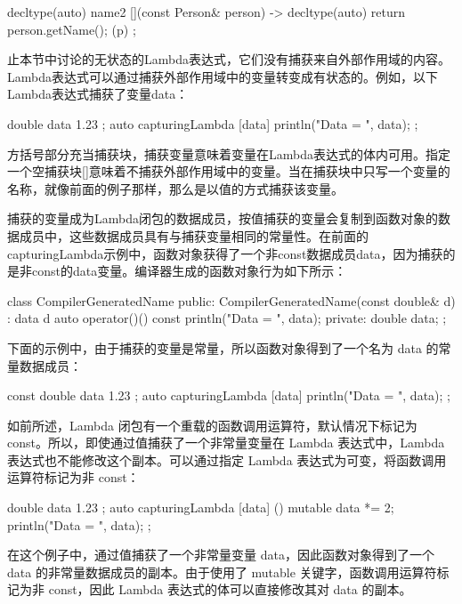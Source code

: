\begin{cpp}
decltype(auto) name2 { [](const Person& person) -> decltype(auto) {
        return person.getName(); }(p) };
\end{cpp}

止本节中讨论的无状态的Lambda表达式，它们没有捕获来自外部作用域的内容。Lambda表达式可以通过捕获外部作用域中的变量转变成有状态的。例如，以下Lambda表达式捕获了变量data：

\begin{cpp}
double data { 1.23 };
auto capturingLambda { [data]{ println("Data = {}", data); } };
\end{cpp}

方括号部分充当捕获块，捕获变量意味着变量在Lambda表达式的体内可用。指定一个空捕获块[]意味着不捕获外部作用域中的变量。当在捕获块中只写一个变量的名称，就像前面的例子那样，那么是以值的方式捕获该变量。

捕获的变量成为Lambda闭包的数据成员，按值捕获的变量会复制到函数对象的数据成员中，这些数据成员具有与捕获变量相同的常量性。在前面的capturingLambda示例中，函数对象获得了一个非const数据成员data，因为捕获的是非const的data变量。编译器生成的函数对象行为如下所示：

\begin{cpp}
class CompilerGeneratedName
{
    public:
        CompilerGeneratedName(const double& d) : data { d } {}
        auto operator()() const { println("Data = {}", data); }
    private:
        double data;
};
\end{cpp}

下面的示例中，由于捕获的变量是常量，所以函数对象得到了一个名为 data 的常量数据成员：

\begin{cpp}
const double data { 1.23 };
auto capturingLambda { [data]{ println("Data = {}", data); } };
\end{cpp}

如前所述，Lambda 闭包有一个重载的函数调用运算符，默认情况下标记为 const。所以，即使通过值捕获了一个非常量变量在 Lambda 表达式中，Lambda 表达式也不能修改这个副本。可以通过指定 Lambda 表达式为可变，将函数调用运算符标记为非 const：

\begin{cpp}
double data { 1.23 };
auto capturingLambda {
    [data] () mutable { data *= 2; println("Data = {}", data); } };
\end{cpp}

在这个例子中，通过值捕获了一个非常量变量 data，因此函数对象得到了一个 data 的非常量数据成员的副本。由于使用了 mutable 关键字，函数调用运算符标记为非 const，因此 Lambda 表达式的体可以直接修改其对 data 的副本。

